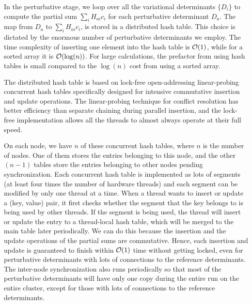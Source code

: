 \documentclass[%
reprint,
 superscriptaddress,
 amsmath,amssymb,
 aps,
]{revtex4-1}
\begin{document}
In the perturbative stage, we loop over all the variational determinants $\{D_i\}$ to compute the partial sum $\sum_i H_{ai}c_{i}$
for each perturbative determinant $D_a$.
The map from $D_a$ to $\sum_i H_{ai}c_{i}$, is stored in a distributed hash table.
This choice is dictated by the enormous number of perturbative determinants we employ.
The time complexity of inserting one element into the hash table is ${\cal O}(1)$, while for a sorted array it is ${\cal O}(\log(n))$.
For large calculations, the prefactor from using hash tables is small compared to the $\log(n)$ cost from using a sorted array.

The distributed hash table is based on lock-free open-addressing linear-probing concurrent hash tables specifically designed
for intensive commutative insertion and update operations.
The linear-probing technique for conflict resolution has better efficiency than separate chaining during parallel insertion,
and the lock-free implementation allows all the threads to almost always operate at their full speed.

On each node, we have $n$ of these concurrent hash tables, where $n$ is the number of nodes.
One of them stores the entries belonging to this node, and the other $(n-1)$ tables store the entries belonging to other nodes pending synchronization.
Each concurrent hash table is implemented as lots of segments (at least four times the number of hardware threads) and each segment can be modified by only one thread at a time.
When a thread wants to insert or update a (key, value) pair, it first checks whether the segment that the key belongs to is being used by other threads.
If the segment is being used, the thread will insert or update the entry to a thread-local hash table, which will be merged to the main table later periodically.
We can do this because the insertion and the update operations of the partial sums are commutative.
Hence, each insertion and update is guaranteed to finish within ${\cal O}(1)$ time without getting locked, even for perturbative determinants with lots of connections to the reference determinants.
The inter-node synchronization also runs periodically so that most of the perturbative determinants will have only one copy during the entire run on the entire cluster, except for those with lots of connections to the reference determinants.
\end{document}
